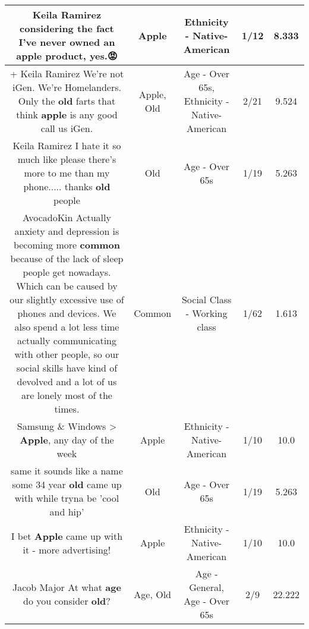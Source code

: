 \documentclass[11pt]{article}
\newlength\mylength
\begin{document}
\begin{center}
\begin{longtable}{|C{.65\mylength}|C{.30\mylength}|C{.12\mylength}|C{.12\mylength}|C{.12\mylength}|}
  \small Keila Ramirez considering the fact I've never owned an \textbf{apple} product, yes.😡\normalsize   & Apple & Ethnicity - Native-American & 1/12 & 8.333 \\  \hline
  \small +
Keila Ramirez
We're not iGen. We're Homelanders. Only the \textbf{old} farts that think \textbf{apple} is any good call us iGen.\normalsize   & Apple, Old & Age - Over 65s, Ethnicity - Native-American & 2/21 & 9.524 \\  \hline
  \small Keila Ramirez I hate it so much like please there's more to me than my phone..... thanks \textbf{old} people\normalsize   & Old & Age - Over 65s & 1/19 & 5.263 \\  \hline
  \small AvocadoKin Actually anxiety and depression is becoming more \textbf{common} because of the lack of sleep people get nowadays. Which can be caused by our slightly excessive use of phones and devices. We also spend a lot less time actually communicating with other people, so our social skills have kind of devolved and a lot of us are lonely most of the times.\normalsize   & Common & Social Class - Working class & 1/62 & 1.613 \\  \hline
  \small Samsung \& Windows > \textbf{Apple}, any day of the week\normalsize   & Apple & Ethnicity - Native-American & 1/10 & 10.0 \\  \hline
  \small same it sounds like a name some 34 year \textbf{old} came up with while tryna be 'cool and hip'\normalsize   & Old & Age - Over 65s & 1/19 & 5.263 \\  \hline
  \small I bet \textbf{Apple} came up with it - more advertising!\normalsize   & Apple & Ethnicity - Native-American & 1/10 & 10.0 \\  \hline
  \small Jacob Major At what \textbf{age} do you consider \textbf{old}?\normalsize   & Age, Old & Age - General, Age - Over 65s & 2/9 & 22.222 \\  \hline

\end{longtable}
\end{center}
\end{document}
